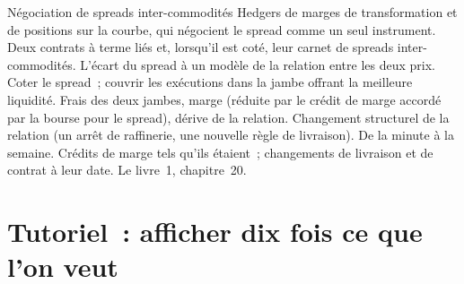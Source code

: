 \begin{strategyfile}{Négociation de spreads inter-commodités}\label{strat:hf:futures-market-making:intercommodity}
 Hedgers de marges de transformation et de positions sur la courbe, qui négocient le spread comme un seul instrument.
 Deux contrats à terme liés et, lorsqu'il est coté, leur carnet de spreads inter-commodités.
 L'écart du spread à un modèle de la relation entre les deux prix.
 Coter le spread~; couvrir les exécutions dans la jambe offrant la meilleure liquidité.
 Frais des deux jambes, marge (réduite par le crédit de marge accordé par la bourse pour le spread), dérive de la relation.
 Changement structurel de la relation (un arrêt de raffinerie, une nouvelle règle de livraison).
 De la minute à la semaine.
 Crédits de marge tels qu'ils étaient~; changements de livraison et de contrat à leur date.
 Le livre~1, chapitre~20.
\end{strategyfile}

\section{Tutoriel~: afficher dix fois ce que l'on veut}\label{tut:hf:futures-market-making:tut}

